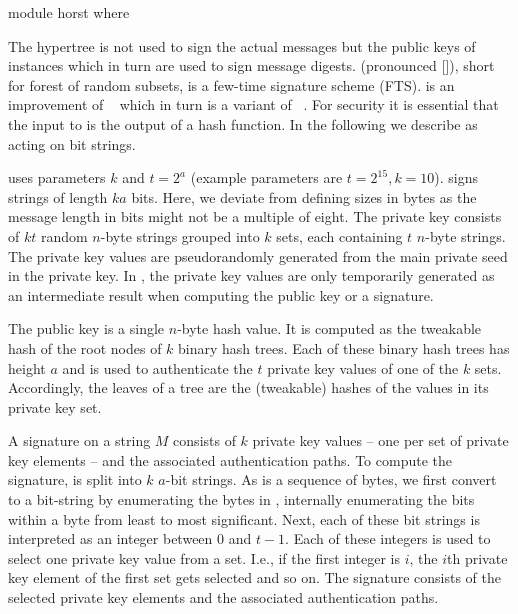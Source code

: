 %
\begin{code}
  module horst where
\end{code}

The \spx hypertree \hyper is not used to sign the actual messages but the
public keys of \fors instances which in turn are used to sign message digests.
\fors (pronounced []), short for forest of random subsets, is a few-time
signature scheme (FTS). \fors is an improvement of \horst~\cite{Bernstein2015}
which in turn is a variant of \hors~\cite{Reyzin2002}.
For security it is essential that the input to \fors is the output of a
hash function. In the following we describe \fors as acting on bit strings.


\fors uses parameters $k$ and $t=2^a$ (example parameters are $t=2^{15}, k=10$).
\fors signs strings of length $ka$ bits. Here, we deviate from defining
sizes in bytes as the message length in bits might not be a multiple of eight.
The private key consists of $kt$
random $n$-byte strings grouped
into $k$ sets, each containing $t$ $n$-byte strings. The private key values
are pseudorandomly generated from the main private seed \sseed in the \spx private
key. In \spx, the \fors private key values are only temporarily generated as an
intermediate result when computing the public key or a signature.

The \fors public key is a single $n$-byte hash value. It is computed as the
tweakable hash of the root nodes of $k$ binary hash trees. Each of these binary
hash trees has height $a$ and is used to authenticate the $t$ private key
values of one of the $k$ sets. Accordingly, the leaves of a tree are the
(tweakable) hashes of the values in its private key set.

A signature on a string $M$ consists of $k$ private key values -- one per
set of private key elements -- and the
associated authentication paths. To compute the signature, \md is
split into $k$ $a$-bit strings. As \md is a sequence of bytes,
we first convert to a bit-string by enumerating the bytes in \md,
internally enumerating the bits within a byte from least to most significant.
Next, each of these bit strings is
interpreted as an integer between $0$ and $t-1$. Each of these integers is used to
select one private key value from a set. I.e., if the first integer is $i$, the
$i$th private key element of the first set gets selected and so on. The signature
consists of the selected private key elements and the associated authentication
paths.


